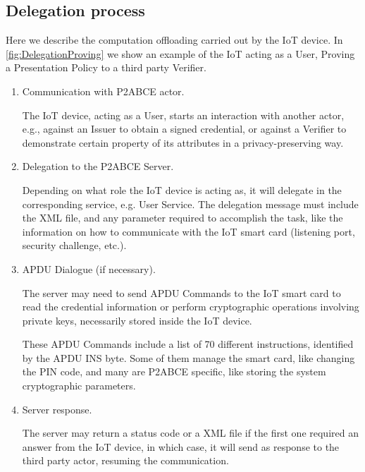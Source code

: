 \documentclass[journal]{IEEEtran}
\begin{document}
%

\subsection{Delegation process}

Here we describe the computation offloading carried out by the IoT device.  In \autoref{fig:DelegationProving} we show an example of the IoT acting as a User, Proving a Presentation Policy to a third party Verifier.

\begin{enumerate}
	\item Communication with P2ABCE actor.
	
	The IoT device, acting as a User, starts an interaction with another actor, e.g., against an Issuer to obtain a signed credential, or against a Verifier to demonstrate certain property of its attributes in a privacy-preserving way.
	
	\item Delegation to the P2ABCE Server.
	
	Depending on what role the IoT device is acting as, it will delegate in the corresponding service, e.g. User Service. The delegation message must include the XML file, and any parameter required to accomplish the task, like the information on how to communicate with the IoT smart card (listening port, security challenge, etc.).
	
	\item APDU Dialogue (if necessary).
	
	The server may need to send APDU Commands to the IoT smart card to read the credential information or perform cryptographic operations involving private keys, necessarily stored inside the IoT device.
	
	These APDU Commands include a list of 70 different instructions, identified by the APDU INS byte. Some of them manage the smart card, like changing the PIN code, and many are P2ABCE specific, like storing the system cryptographic parameters.
	
	\hfil
	
	\item Server response.
	
	The server may return a status code or a XML file if the first one required an answer from the IoT device, in which case, it will send as response to the third party actor, resuming the communication.
	
\end{enumerate}
\end{document}

